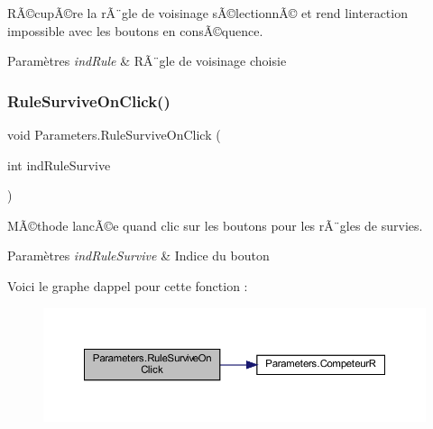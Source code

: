 RÃ©cupÃ©re la rÃ¨gle de voisinage sÃ©lectionnÃ© et rend l\textquotesingle{}interaction impossible avec les boutons en consÃ©quence. 


\begin{DoxyParams}{Paramètres}
{\em ind\+Rule} & RÃ¨gle de voisinage choisie\\
\hline
\end{DoxyParams}
\mbox{\label{class_parameters_af62c0383d55e0653fcd2384b9d49d42f}} 
\subsubsection{\texorpdfstring{Rule\+Survive\+On\+Click()}{RuleSurviveOnClick()}}
{\footnotesize\ttfamily void Parameters.\+Rule\+Survive\+On\+Click (\begin{DoxyParamCaption}\item[{int}]{ind\+Rule\+Survive }\end{DoxyParamCaption})\hspace{0.3cm}{\ttfamily [inline]}}



MÃ©thode lancÃ©e quand clic sur les boutons pour les rÃ¨gles de survies. 


\begin{DoxyParams}{Paramètres}
{\em ind\+Rule\+Survive} & Indice du bouton\\
\hline
\end{DoxyParams}
Voici le graphe d\textquotesingle{}appel pour cette fonction \+:
\nopagebreak
\begin{figure}[H]
\begin{center}
\leavevmode
\includegraphics[width=350pt]{class_parameters_af62c0383d55e0653fcd2384b9d49d42f_cgraph}
\end{center}
\end{figure}
\mbox{\label{class_parameters_aa31bc8929b4008944bd7f720bfac9a62}} 
